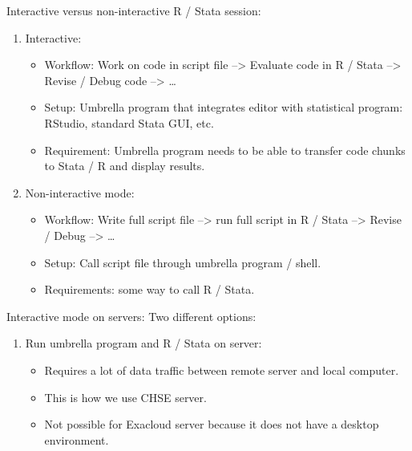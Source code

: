 \documentclass[12pt,t,xcolor=table]{beamer}
\begin{document}
\begin{frame}[label={sec:orgheadline10}]{Interactive versus non-interactive R / Stata session:}
\begin{enumerate}
\item Interactive: 

\begin{itemize}
\item Workflow: Work on code in script file --> Evaluate code in R / Stata --> Revise / Debug code --> \ldots{}

\item Setup: Umbrella program that integrates editor with statistical program: RStudio, standard Stata GUI, etc.

\item Requirement: Umbrella program needs to be able to transfer code chunks to Stata / R and display results.
\end{itemize}

\item Non-interactive mode:

\begin{itemize}
\item Workflow: Write full script file --> run full script in R / Stata --> Revise / Debug --> \ldots{}

\item Setup: Call script file through umbrella program / shell.

\item Requirements: some way to call R / Stata.
\end{itemize}
\end{enumerate}
\end{frame}

\begin{frame}[label={sec:orgheadline11}]{Interactive mode on servers:}
Two different options:

\begin{enumerate}
\item Run umbrella program and R / Stata on server:

\begin{itemize}
\item Requires a lot of data traffic between remote server and local computer.

\item This is how we use CHSE server.

\item Not possible for Exacloud server because it does not have a desktop environment.
\end{itemize}
\end{enumerate}
\end{frame}
\end{document}
